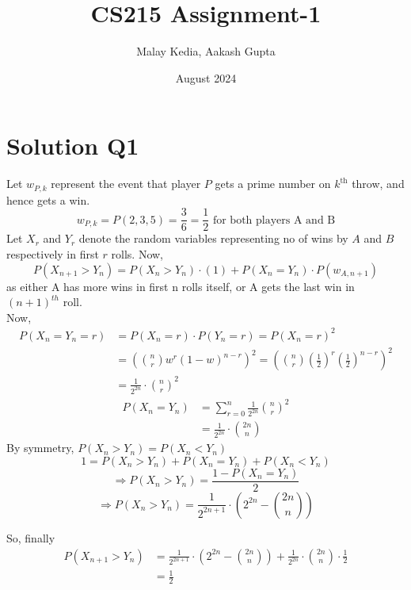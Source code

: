 \documentclass[fleqn]{article}
\title{CS215 Assignment-1}
\author{Malay Kedia, Aakash Gupta}
\date{August 2024}
\begin{document}
\maketitle

\section{Solution Q1}

Let $w_{P, k}$ represent the event that player $P$ gets a prime number on $k^{\text {th}}$ throw, and hence gets a win.
\[
w_{P, k} = P(2,3,5)=\frac{3}{6}=\frac{1}{2} \text{ for both players A and B}
\]
Let $X_r$ and $Y_r$ denote the random variables representing no of wins by $A$ and $B$ respectively in first $r$ rolls.  Now,
\[
P(X_{n+1}>Y_n)=P(X_n>Y_n)\cdot(1)+P(X_n=Y_n) \cdot P(w_{A, n+1})
\]
as either A has more wins in first n rolls itself, or A gets the last win in $(n+1)^{th}$ roll.\\
Now,
\begin{align*}
P(X_n = Y_n = r) &= P(X_n = r) \cdot P(Y_n = r) = P(X_n = r)^2 \\
&= \left(\binom{n}{r} w^r (1-w)^{n-r}\right)^2 = \left(\binom{n}{r} \left(\frac{1}{2}\right)^r \left(\frac{1}{2}\right)^{n-r}\right)^2 \\
&= \frac{1}{2^{2n}}\cdot \binom{n}{r}^2
\end{align*}
\begin{align*}
P(X_n = Y_n) &= \sum_{r=0}^n \frac{1}{2^{2n}} \binom{n}{r}^2 \\
&= \frac{1}{2^{2n}}\cdot \binom{2n}{n}
\end{align*}
By symmetry, $P(X_n>Y_n)=P(X_n<Y_n)$
\[
1=P\left(X_n>Y_n\right)+P\left(X_n=Y_n\right)+P\left(X_n<Y_n\right) 
\]
\[
\Rightarrow P\left(X_n>Y_n\right)=\frac{1-P\left(X_n=Y_n\right)}{2}
\]
\[
\Rightarrow P\left(X_n > Y_n\right) = \frac{1}{2^{2n+1}} \cdot \left(2^{2n} - \binom{2n}{n}\right)
\]

So, finally
\begin{align*}
P(X_{n+1}>Y_n)&=\frac{1}{2^{2n+1}} \cdot \left(2^{2n} - \binom{2n}{n}\right)+\frac{1}{2^{2n}}\cdot \binom{2n}{n} \cdot \frac{1}{2}\\
& =\frac{1}{2}
\end{align*}

\newpage
\end{document}
